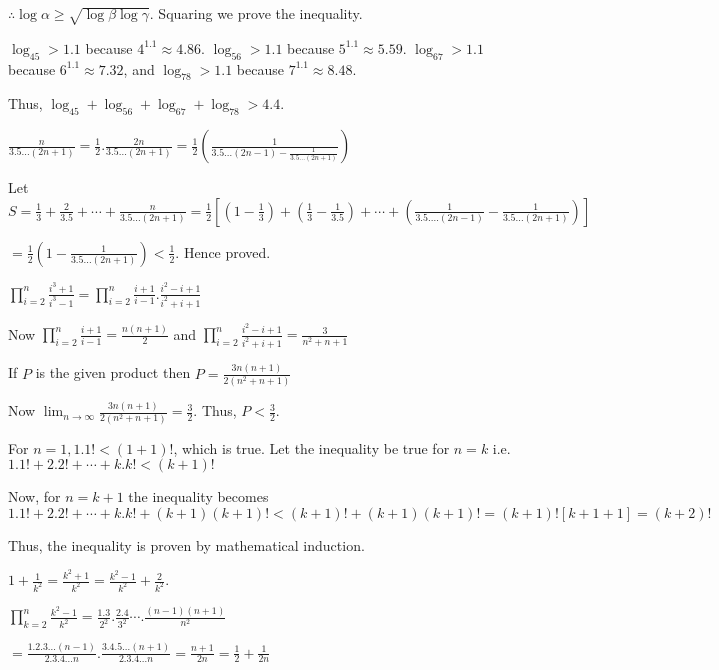   $\therefore \log\alpha\geq \sqrt{\log\beta\log\gamma}$. Squaring we prove the inequality.
\item $\log_45 > 1.1$ because $4^{1.1} \approx 4.86$. $\log_56 > 1.1$ because $5^{1.1}\approx
  5.59$. $\log_67 > 1.1$ because $6^{1.1}\approx 7.32$, and $\log_78 > 1.1$ because $7^{1.1} \approx 8.48$.

  Thus, $\log_45 + \log_56 + \log_67 + \log_78> 4.4$.
\item $\frac{n}{3.5\ldots(2n + 1)} = \frac{1}{2}.\frac{2n}{3.5\ldots(2n + 1)} =
  \frac{1}{2}\left(\frac{1}{3.5\ldots(2n - 1) - \frac{1}{3.5\ldots(2n + 1)}}\right)$

  Let $S = \frac{1}{3} + \frac{2}{3.5} + \cdots + \frac{n}{3.5\ldots(2n + 1)} = \frac{1}{2}\left[\left(1 -
    \frac{1}{3}\right) + \left(\frac{1}{3} - \frac{1}{3.5}\right) + \cdots + \left(\frac{1}{3.5.\ldots(2n -
      1)} - \frac{1}{3.5\ldots(2n + 1)}\right)\right]$

  $= \frac{1}{2}\left(1 - \frac{1}{3.5\ldots(2n + 1)}\right) < \frac{1}{2}$. Hence proved.
\item $\displaystyle\prod_{i = 2}^n\frac{i^3 + 1}{i^3 - 1} = \prod_{i = 2}^n\frac{i + 1}{i - 1}.\frac{i^2 -
  i + 1}{i^2 + i + 1}$

  Now $\displaystyle\prod_{i = 2}^n\frac{i + 1}{i - 1} = \frac{n(n + 1)}{2}$ and $\displaystyle\prod_{i =
    2}^n\frac{i^2 - i + 1}{i^2 + i + 1} = \frac{3}{n^2 + n + 1}$

  If $P$ is the given product then $P = \frac{3n(n + 1)}{2(n^2 + n + 1)}$

  Now $\displaystyle\lim_{n\to \infty} \frac{3n(n + 1)}{2(n^2 + n + 1)}= \frac{3}{2}$. Thus, $P <
  \frac{3}{2}$.
\item For $n = 1, 1.1! < (1 + 1)!$, which is true. Let the inequality be true for $n = k$ i.e. $1.1! + 2.2!
  + \cdots + k.k! < (k + 1)!$

  Now, for $n = k + 1$ the inequality becomes $1.1! + 2.2! + \cdots + k.k! + (k + 1)(k + 1)! < (k + 1)! + (k
  + 1)(k + 1)! = (k + 1)![k + 1 + 1] = (k + 2)!$

  Thus, the inequality is proven by mathematical induction.
\item $1 + \frac{1}{k^2} = \frac{k^2 + 1}{k^2} = \frac{k^2 - 1}{k^2} + \frac{2}{k^2}$.

  $\displaystyle\prod_{k = 2}^n\frac{k^2 - 1}{k^2} =
  \frac{1.3}{2^2}.\frac{2.4}{3^2}\cdots.\frac{(n - 1)(n + 1)}{n^2}$

  $= \frac{1.2.3\ldots(n - 1)}{2.3.4\ldots n}.\frac{3.4.5\ldots(n + 1)}{2.3.4\ldots n} = \frac{n + 1}{2n} =
  \frac{1}{2} + \frac{1}{2n}$

